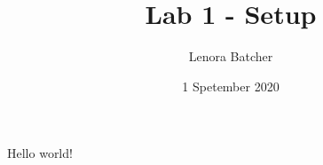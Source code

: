 \documentclass{article}
\title{Lab 1 - Setup}
\author{Lenora Batcher}
\date{1 Spetember 2020}
\begin{document}
   \maketitle
   Hello world!
\end{document}
